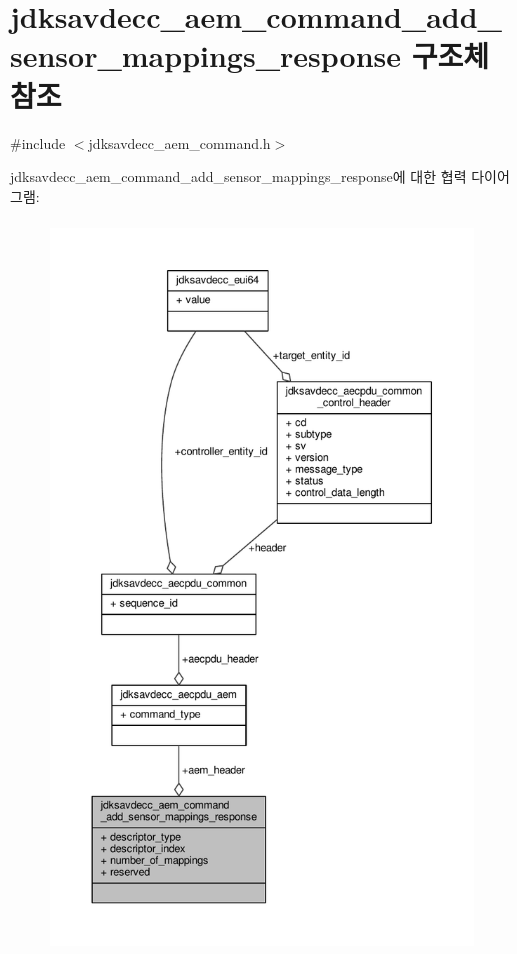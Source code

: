 \hypertarget{structjdksavdecc__aem__command__add__sensor__mappings__response}{}\section{jdksavdecc\+\_\+aem\+\_\+command\+\_\+add\+\_\+sensor\+\_\+mappings\+\_\+response 구조체 참조}
\label{structjdksavdecc__aem__command__add__sensor__mappings__response}


{\ttfamily \#include $<$jdksavdecc\+\_\+aem\+\_\+command.\+h$>$}



jdksavdecc\+\_\+aem\+\_\+command\+\_\+add\+\_\+sensor\+\_\+mappings\+\_\+response에 대한 협력 다이어그램\+:
\nopagebreak
\begin{figure}[H]
\begin{center}
\leavevmode
\includegraphics[height=550pt]{structjdksavdecc__aem__command__add__sensor__mappings__response__coll__graph}
\end{center}
\end{figure}

